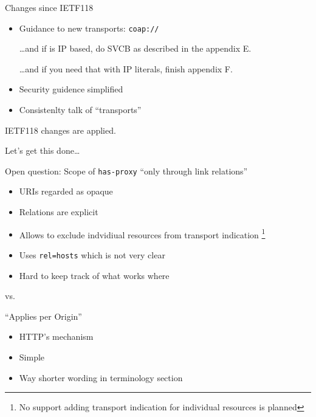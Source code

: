 \begin{frame}{Changes since IETF118}\Large
  \begin{itemize}
    \item Guidance to new transports: \texttt{coap://}
      
      \ldots and if is IP based, do SVCB as described in the appendix E.

      \ldots and if you need that with IP literals, finish appendix F.
    \item Security guidence simplified
    \item Consistenlty talk of ``transports''
  \end{itemize}
\end{frame}

\begin{frame}{}\Huge
  \center
  IETF118 changes are applied.

  \bigskip

  Let's get this done\ldots
\end{frame}

\begin{frame}{Open question: Scope of \texttt{has-proxy}}\large
  ``only through link relations''

  \begin{itemize}
    \item URIs regarded as opaque
    \item Relations are explicit
    \item Allows to exclude indvidiual resources from transport indication
      \footnote{No support adding transport indication for individual resources is planned}
    \item Uses  \texttt{rel=hosts} which is not very clear
    \item Hard to keep track of what works where
  \end{itemize}
  
  \begin{center}
  vs.
  \end{center}

  ``Applies per Origin''

  \begin{itemize}
    \item HTTP's mechanism
    \item Simple
    \item Way shorter wording in terminology section
  \end{itemize}
\end{frame}

